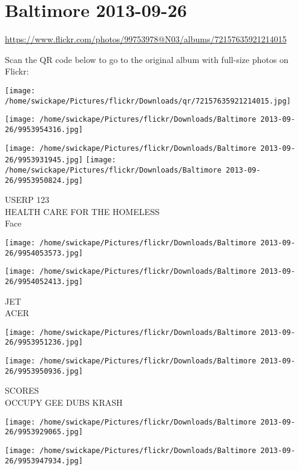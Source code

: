 \documentclass[10pt,letterpaper]{article}
\title{}
\author{}
\date{}
\begin{document}
\section*{Baltimore 2013-09-26}

\url{https://www.flickr.com/photos/99753978@N03/albums/72157635921214015}

Scan the QR code below to go to the original album with full-size photos on Flickr:

\texttt{[image: /home/swickape/Pictures/flickr/Downloads/qr/72157635921214015.jpg]}
\pagebreak

\texttt{[image: /home/swickape/Pictures/flickr/Downloads/Baltimore 2013-09-26/9953954316.jpg]}

\vspace{0.25in}
\texttt{[image: /home/swickape/Pictures/flickr/Downloads/Baltimore 2013-09-26/9953931945.jpg]}
\texttt{[image: /home/swickape/Pictures/flickr/Downloads/Baltimore 2013-09-26/9953950824.jpg]}

USERP 123\\
HEALTH CARE FOR THE HOMELESS\\
Face
\pagebreak

\texttt{[image: /home/swickape/Pictures/flickr/Downloads/Baltimore 2013-09-26/9954053573.jpg]}

\vspace{0.25in}
\texttt{[image: /home/swickape/Pictures/flickr/Downloads/Baltimore 2013-09-26/9954052413.jpg]}

JET\\
ACER
\pagebreak

\texttt{[image: /home/swickape/Pictures/flickr/Downloads/Baltimore 2013-09-26/9953951236.jpg]}

\vspace{0.25in}
\texttt{[image: /home/swickape/Pictures/flickr/Downloads/Baltimore 2013-09-26/9953950936.jpg]}

SCORES\\
OCCUPY GEE DUBS KRASH
\pagebreak

\texttt{[image: /home/swickape/Pictures/flickr/Downloads/Baltimore 2013-09-26/9953929065.jpg]}

\vspace{0.25in}
\texttt{[image: /home/swickape/Pictures/flickr/Downloads/Baltimore 2013-09-26/9953947934.jpg]}
\end{document}
